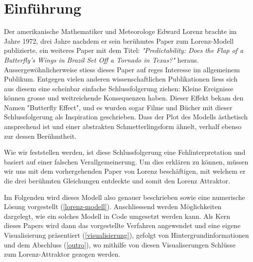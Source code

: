 
\section{Einführung}
Der amerikanische Mathematiker und Meteorologe Edward Lorenz brachte im Jahre 1972, drei Jahre nachdem er sein berühmtes Paper zum Lorenz-Modell publizierte, ein weiteres Paper mit dem Titel: \textit{"Predictability: Does the Flap of a Butterfly’s Wings in Brazil Set Off a Tornado in Texas?"} heraus. Aussergewöhnlicherweise stiess dieses Paper auf reges Interesse im allgemeinem Publikum. Entgegen vielen anderen wissenschaftlichen Publikationen liess sich aus diesem eine scheinbar einfache Schlussfolgerung ziehen: Kleine Ereignisse können grosse und weitreichende Konsequenzen haben. Dieser Effekt bekam den Namen "Butterfly Effect", und es wurden sogar Filme und Bücher mit dieser Schlussfolgerung als Inspiration geschrieben. Dass der Plot des Modells ästhetisch ansprechend ist und einer abstrakten Schmetterlingsform ähnelt, verhalf ebenso zur dessen Berühmtheit. 


Wie wir feststellen werden, ist diese Schlussfolgerung eine Fehlinterpretation und basiert auf einer falschen Verallgemeinerung. Um dies erklären zu können, müssen wir uns mit dem vorhergehenden Paper von Lorenz beschäftigen, mit welchem er die drei berühmten Gleichungen entdeckte und somit den Lorenz Attraktor. 

Im Folgenden wird dieses Modell also genauer beschrieben sowie eine numerische Lösung vorgestellt (\ref{lorenz-modell}). Anschliessend werden Möglichkeiten dargelegt, wie ein solches Modell in Code umgesetzt werden kann. Als Kern dieses Papers wird dann das vorgestellte Verfahren angewendet und eine eigene Visualisierung präsentiert (\ref{visualisierung}), gefolgt von  Hintergrundinformationen und dem Abschluss (\ref{outro}), wo mithilfe von diesen Visualiserungen Schlüsse zum Lorenz-Attraktor gezogen werden. 